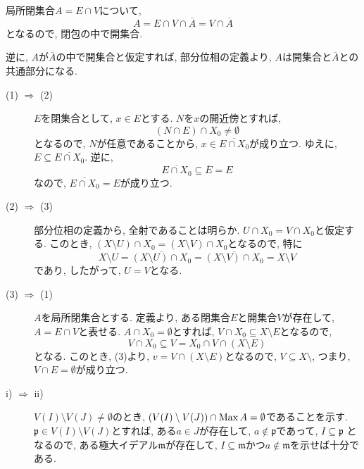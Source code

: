 \documentclass[dvipdfmx]{jsarticle}
\begin{document}
    \begin{problem}
        局所閉集合$A = E \cap V$について,
        \[
            A = E \cap V \cap \overline{A} = V \cap \overline{A}
        \]
        となるので, 閉包の中で開集合.

        逆に, $A$が$\overline{A}$の中で開集合と仮定すれば, 部分位相の定義より, $A$は開集合と$\overline{A}$との共通部分になる.
        \begin{description}
            \item[(1) $\Rightarrow$ (2)]
            $E$を閉集合として, $x \in E$とする.
            $N$を$x$の開近傍とすれば,
            \[
                (N \cap E) \cap X_0 \neq \emptyset
            \]
            となるので, $N$が任意であることから,
            $x \in \overline{E \cap X_0}$が成り立つ.
            ゆえに, $E \subseteq \overline{E \cap X_0}$.
            逆に,
            \[
                \overline{E \cap X_0} \subseteq \overline{E} = E
            \]
            なので, $\overline{E \cap X_0} = E$が成り立つ.
            \item [(2) $\Rightarrow$ (3)]
            部分位相の定義から, 全射であることは明らか.
            $U \cap X_0 = V \cap X_0$と仮定する.
            このとき,
            $(X \setminus U) \cap X_0 = (X \setminus V) \cap X_0$となるので,
            特に
            \[
                X \setminus U = \overline{(X \setminus U) \cap X_0} = \overline{(X \setminus V) \cap X_0} = X \setminus V
            \]
            であり,
            したがって, $U = V$となる.
            \item [(3) $\Rightarrow$ (1)]
            $A$を局所閉集合とする.
            定義より, ある閉集合$E$と開集合$V$が存在して, $A = E \cap V$と表せる.
            $A \cap X_0 = \emptyset$とすれば,
            $V \cap X_0 \subseteq X \setminus E$となるので,
            \[
                V \cap X_0 \subseteq V = X_0 \cap V \cap (X \setminus E)
            \]
            となる.
            このとき, (3)より, $v = V \cap (X \setminus E)$となるので,
            $V \subseteq X \setminus$, つまり, $V \cap E = \emptyset$が成り立つ.
            \item [i) $\Rightarrow$ ii)]
            $V(I) \setminus V(J) \neq \emptyset$のとき,
            $(V(I) \setminus V(J)) \cap \operatorname{Max}{A} = \emptyset$であることを示す.
            $\mathfrak{p} \in V(I) \setminus V(J)$とすれば, ある$a \in J$が存在して, $a \notin \mathfrak{p}$であって, $I \subseteq \mathfrak{p}$
            となるので, ある極大イデアル$\mathfrak{m}$が存在して,
            $I \subseteq \mathfrak{m}$かつ$a \notin \mathfrak{m}$を示せば十分である.

\end{description}
\end{problem}
\end{document}
